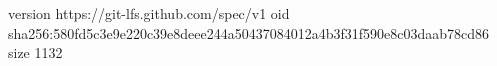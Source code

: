version https://git-lfs.github.com/spec/v1
oid sha256:580fd5c3e9e220c39e8deee244a50437084012a4b3f31f590e8c03daab78cd86
size 1132
